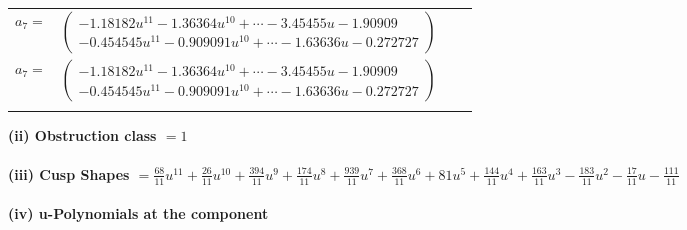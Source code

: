\documentclass[1p]{elsarticle_modified}
\theoremstyle{definition}
\begin{document}
\begin{tabular}{m{7pt} m{180pt} m{7pt} m{180pt} }
\flushright $a_{7}=$&$\begin{pmatrix}-1.18182 u^{11}-1.36364 u^{10}+\cdots-3.45455 u-1.90909\\-0.454545 u^{11}-0.909091 u^{10}+\cdots-1.63636 u-0.272727\end{pmatrix}$\\ \flushright $a_{7}=$&$\begin{pmatrix}-1.18182 u^{11}-1.36364 u^{10}+\cdots-3.45455 u-1.90909\\-0.454545 u^{11}-0.909091 u^{10}+\cdots-1.63636 u-0.272727\end{pmatrix}$\\&\end{tabular}
\flushleft \textbf{(ii) Obstruction class $= 1$}\\~\\
\flushleft \textbf{(iii) Cusp Shapes $= \frac{68}{11} u^{11}+\frac{26}{11} u^{10}+\frac{394}{11} u^9+\frac{174}{11} u^8+\frac{939}{11} u^7+\frac{368}{11} u^6+81 u^5+\frac{144}{11} u^4+\frac{163}{11} u^3-\frac{183}{11} u^2-\frac{17}{11} u-\frac{111}{11}$}\\~\\
\newpage\renewcommand{\arraystretch}{1}
\flushleft \textbf{(iv) u-Polynomials at the component}\newline \\
\end{document}
